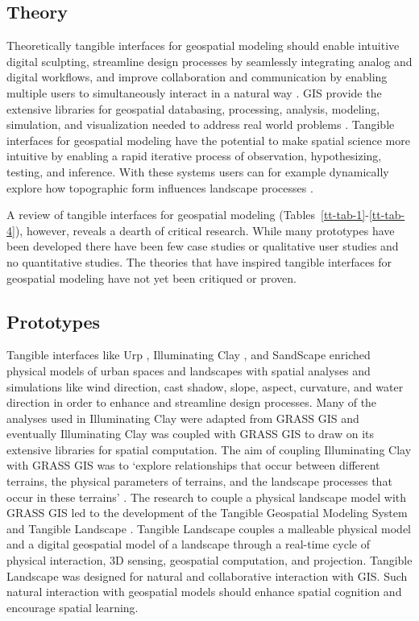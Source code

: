 \subsection{Theory}
%
Theoretically tangible interfaces for geospatial modeling
should enable 
intuitive digital sculpting, 
streamline design processes by seamlessly integrating 
analog and digital workflows, and 
improve collaboration and communication by enabling multiple users 
to simultaneously interact 
in a natural way \cite{Ratti2004}. 
GIS provide the extensive libraries for geospatial databasing, 
processing, analysis, modeling, simulation, and visualization 
needed to address real world problems \cite{Tateosian2010}. 
%
Tangible interfaces for geospatial modeling 
have the potential to make spatial science more intuitive 
by enabling a rapid iterative process 
of observation, hypothesizing, testing, and inference.
With these systems users can for example 
dynamically explore how topographic form 
influences landscape processes \cite{Mitasova2006}. 

A review of tangible interfaces for geospatial modeling
(Tables~\ref{tt-tab-1}-\ref{tt-tab-4}), however, 
reveals a dearth of critical research.
While many prototypes have been developed
there have been 
few case studies or qualitative user studies
and no quantitative studies.
The theories that have inspired 
 tangible interfaces for geospatial modeling
have not yet been critiqued or proven. 

\subsection{Prototypes}

Tangible interfaces like 
Urp \cite{Underkoffler1999}, 
Illuminating Clay \cite{Piper2002a}, 
and SandScape \cite{Ratti2004} 
enriched physical models of urban spaces and landscapes 
with spatial analyses and simulations 
like wind direction, cast shadow, 
slope, aspect, curvature, and water direction
in order to enhance and streamline design processes. 
Many of the analyses used in Illuminating Clay 
were adapted from GRASS GIS \cite{Piper2002a}
and eventually 
Illuminating Clay was coupled with GRASS GIS 
to draw on its extensive libraries for spatial computation. 
The aim of coupling Illuminating Clay with GRASS GIS was to 
`explore relationships that occur between different terrains, 
the physical parameters of terrains, 
and the landscape processes 
that occur in these terrains' \cite{Mitasova2006}. 
The research to couple a physical landscape model with GRASS GIS 
led to the development of 
the Tangible Geospatial Modeling System \cite{Tateosian2010} 
and Tangible Landscape \cite{Petrasova2014,Petrasova2015}.
Tangible Landscape couples a malleable physical model 
and a digital geospatial model of a landscape 
through a real-time cycle of physical interaction, 3D sensing, 
geospatial computation, and projection. 
Tangible Landscape was designed for
natural and collaborative interaction with GIS.
Such natural interaction with geospatial models should 
enhance spatial cognition and encourage spatial learning. 

